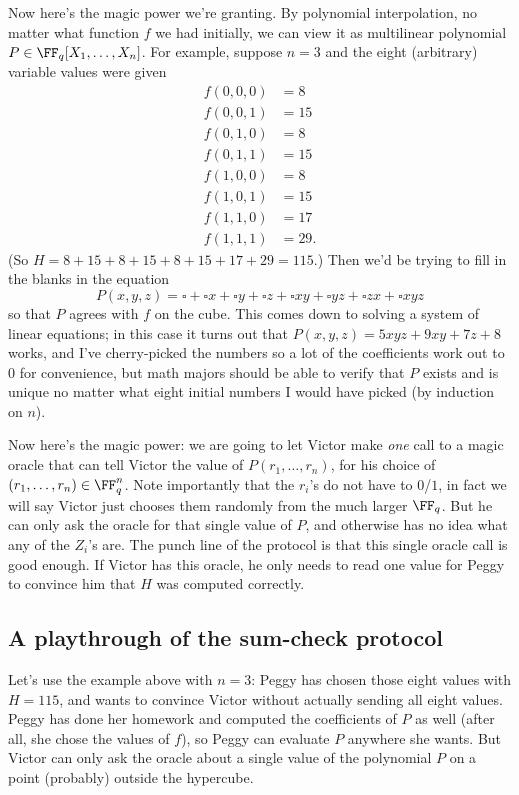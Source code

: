 \documentclass[11pt]{scrreprt}
\begin{document}
Now here's the magic power we're granting.
By polynomial interpolation, no matter what function $f$ we had initially,
we can view it as multilinear polynomial $P \in \FF_q[X_1, \dots, X_n]$.
For example, suppose $n=3$ and the eight (arbitrary) variable values were given
\begin{align*}
  f(0,0,0) &= 8 \\
  f(0,0,1) &= 15 \\
  f(0,1,0) &= 8 \\
  f(0,1,1) &= 15 \\
  f(1,0,0) &= 8 \\
  f(1,0,1) &= 15 \\
  f(1,1,0) &= 17 \\
  f(1,1,1) &= 29.
\end{align*}
(So $H = 8+15+8+15+8+15+17+29 = 115$.)
Then we'd be trying to fill in the blanks in the equation
\[ P(x,y,z) = {\square} + {\square} x + {\square} y + {\square} z
  + {\square} xy + {\square} yz + {\square} zx + {\square} xyz \]
so that $P$ agrees with $f$ on the cube.
This comes down to solving a system of linear equations;
in this case it turns out that $P(x,y,z) = 5xyz + 9xy + 7z + 8$ works,
and I've cherry-picked the numbers so a lot of the coefficients work out to $0$ for
convenience, but math majors should be able to verify that $P$ exists and is unique
no matter what eight initial numbers I would have picked (by induction on $n$).

Now here's the magic power:
we are going to let Victor make \emph{one} call to a magic oracle
that can tell Victor the value of $P(r_1,\dots,r_n)$,
for his choice of $(r_1, \dots, r_n) \in \FF_q^n$.
Note importantly that the $r_i$'s do not have to $0$/$1$,
in fact we will say Victor just chooses them randomly from the much larger $\FF_q$.
But he can only ask the oracle for that single value of $P$,
and otherwise has no idea what any of the $Z_i$'s are.
The punch line of the protocol is that this single oracle call is good enough.
If Victor has this oracle, he only needs to read one value for
Peggy to convince him that $H$ was computed correctly.

\subsection{A playthrough of the sum-check protocol}
Let's use the example above with $n=3$:
Peggy has chosen those eight values with $H = 115$,
and wants to convince Victor without actually sending all eight values.
Peggy has done her homework and computed the coefficients of $P$ as well
(after all, she chose the values of $f$), so Peggy can evaluate $P$ anywhere she wants.
But Victor can only ask the oracle about a single value of the polynomial $P$
on a point (probably) outside the hypercube.
\end{document}

